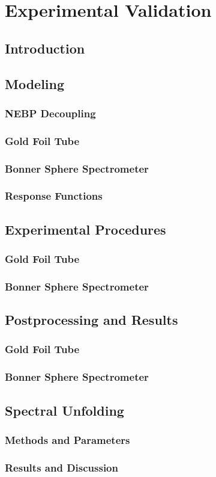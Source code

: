 
\cleardoublepage


\chapter{Experimental Validation}


\section{Introduction}

\section{Modeling}
\subsection{NEBP Decoupling}
\subsection{Gold Foil Tube}
\subsection{Bonner Sphere Spectrometer}
\subsection{Response Functions}

\section{Experimental Procedures}
\subsection{Gold Foil Tube}
\subsection{Bonner Sphere Spectrometer}

\section{Postprocessing and Results}
\subsection{Gold Foil Tube}
\subsection{Bonner Sphere Spectrometer}

\section{Spectral Unfolding}
\subsection{Methods and Parameters}
\subsection{Results and Discussion}


